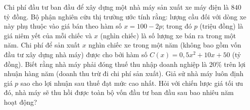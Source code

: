 \begin{ex}%
	Chi phí đầu tư ban đầu để xây dựng một nhà máy sản xuất xe máy điện là $840$ tỷ đồng. Bộ phận nghiên cứu thị trường ước tính rằng: lượng cầu đối với dòng xe này phụ thuộc vào giá bán theo hàm số $x = 100 - 2p$; trong đó $p$ (triệu đồng) là giá niêm yết của mỗi chiếc và $x$ (nghìn chiếc) là số lượng xe bán ra trong một năm. Chi phí để sản xuất $x$ nghìn chiếc xe trong một năm (không bao gồm vốn đầu tư xây dựng nhà máy) được cho bởi hàm số $C(x) = 0,5x^2 + 10x + 50$ (tỷ đồng). Biết rằng nhà máy phải đóng thuế thu nhập doanh nghiệp là $20\%$ trên lợi nhuận hàng năm (doanh thu trừ đi chi phí sản xuất). Giả sử nhà máy luôn định giá $p$ sao cho lợi nhuận sau thuế đạt mức cao nhất. Hỏi với chiến lược giá tối ưu đó, nhà máy sẽ thu hồi được toàn bộ vốn đầu tư ban đầu sau bao nhiêu năm hoạt động?
	\par{}
\end{ex}

